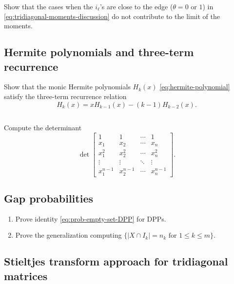 \documentclass[letterpaper,11pt,oneside,reqno]{article}
\numberwithin{equation}{section}
\theoremstyle{definition}
\begin{document}
Show that the cases when the $i_{\ell}$'s are close to the edge ($\theta=0$ or $1$)
in \eqref{eq:tridiagonal-moments-discussion}
do not contribute to the limit of the moments.

\subsection{Hermite polynomials and three-term recurrence}
\label{prob:Hermite-3-term}

Show that the monic Hermite polynomials $H_k(x)$
\eqref{eq:hermite-polynomial}
satisfy the three-term recurrence relation
\begin{equation*}
	\label{eq:hermite-3-term}
	H_k(x) = x H_{k-1}(x) - (k-1) H_{k-2}(x).
\end{equation*}

\subsection{}
\label{prob:Vandermonde-determinant}

Compute the determinant
\begin{equation*}
	\det\left[
		\begin{array}{cccc}
			1 & 1 & \cdots & 1 \\
			x_1 & x_2 & \cdots & x_n \\
			x_1^2 & x_2^2 & \cdots & x_n^2 \\
			\vdots & \vdots & \ddots & \vdots \\
			x_1^{n-1} & x_2^{n-1} & \cdots & x_n^{n-1}
		\end{array}
	\right].
\end{equation*}

\subsection{Gap probabilities}

\begin{enumerate}
	\item
Prove identity
\eqref{eq:prob-empty-set-DPP} for DPPs.
\item Prove the generalization computing
	\(\{|X\cap I_k|=n_k\text{ for }1\le k\le m\}\).
\end{enumerate}


\subsection{Stieltjes transform approach for tridiagonal matrices}
\label{prob:resolvent-diff-eq}
\end{document}
